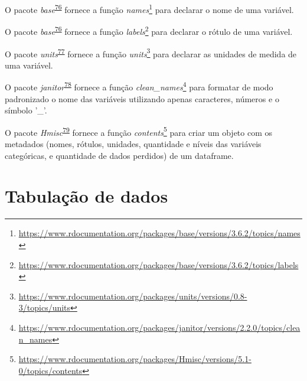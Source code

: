 \documentclass[
  a4paper,
]{book}
\renewcommand{\href}[2]{#2\footnote{\url{#1}}}
\newenvironment{infobox}[1]
  {
  \begin{itemize}
  \renewcommand{\labelitemi}{
    \raisebox{-.7\height}[0pt][0pt]{
      {\setkeys{Gin}{width=3em,keepaspectratio}
        \texttt{[image: \#1]}}
    }
  }
  \setlength{\fboxsep}{1em}
  \begin{blackbox}
  \item
  }
  {
  \end{blackbox}
  \end{itemize}
  }
\begin{document}
\begin{infobox}{images/Rlogo}
O pacote \emph{base}\textsuperscript{\protect\hyperlink{ref-base-3}{76}} fornece a função \href{https://www.rdocumentation.org/packages/base/versions/3.6.2/topics/names}{\emph{names}} para declarar o nome de uma variável.

\end{infobox}

\begin{infobox}{images/Rlogo}
O pacote \emph{base}\textsuperscript{\protect\hyperlink{ref-base-3}{76}} fornece a função \href{https://www.rdocumentation.org/packages/base/versions/3.6.2/topics/labels}{\emph{labels}} para declarar o rótulo de uma variável.

\end{infobox}

\begin{infobox}{images/Rlogo}
O pacote \emph{units}\textsuperscript{\protect\hyperlink{ref-units}{77}} fornece a função \href{https://www.rdocumentation.org/packages/units/versions/0.8-3/topics/units}{\emph{units}} para declarar as unidades de medida de uma variável.

\end{infobox}

\begin{infobox}{images/Rlogo}
O pacote \emph{janitor}\textsuperscript{\protect\hyperlink{ref-janitor}{78}} fornece a função \href{https://www.rdocumentation.org/packages/janitor/versions/2.2.0/topics/clean_names}{\emph{clean\_names}} para formatar de modo padronizado o nome das variáveis utilizando apenas caracteres, números e o símbolo '\_'.

\end{infobox}

\begin{infobox}{images/Rlogo}
O pacote \emph{Hmisc}\textsuperscript{\protect\hyperlink{ref-Hmisc}{79}} fornece a função \href{https://www.rdocumentation.org/packages/Hmisc/versions/5.1-0/topics/contents}{\emph{contents}} para criar um objeto com os metadados (nomes, rótulos, unidades, quantidade e níveis das variáveis categóricas, e quantidade de dados perdidos) de um dataframe.

\end{infobox}

\hypertarget{tabulacao-dados}{%
\chapter{\texorpdfstring{\textbf{Tabulação de dados}}{Tabulação de dados}}\label{tabulacao-dados}}
\end{document}
